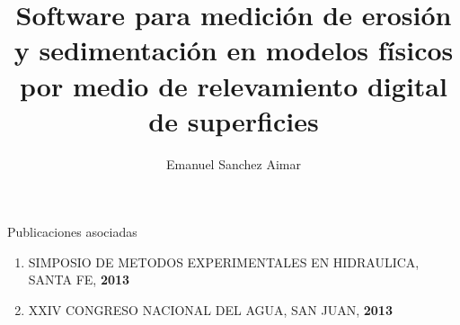 \documentclass[12pt,screen,twoside,pagebackref]{tesis}
\title{Software para medici\'{o}n de erosi\'{o}n y sedimentaci\'{o}n en modelos f\'{i}sicos por medio de relevamiento digital de superficies}
\author{Emanuel Sanchez Aimar}
\begin{document}

\begin{preliminary}


\tableofcontents                %

\begin{abreviaturas}
\end{abreviaturas}

\listoffigures                  %

\listoftables                   %



\end{preliminary}






% 

\begin{biblio}

\end{biblio}

\begin{postliminary}

\begin{seccion}{Publicaciones asociadas}
  \begin{enumerate}

  \item SIMPOSIO DE METODOS EXPERIMENTALES EN HIDRAULICA, SANTA FE, \textbf{2013}

  \item XXIV CONGRESO NACIONAL DEL AGUA, SAN JUAN, \textbf{2013}

  \end{enumerate}
\end{seccion}


\end{postliminary}
\end{document}
